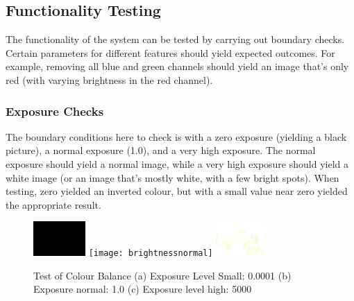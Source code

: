 \documentclass[10pt,a4paper]{article}
\begin{document}
\subsection{Functionality Testing}
The functionality of the system can be tested by carrying out boundary checks. Certain parameters for different features should yield 
expected outcomes. For example, removing all blue and green channels should yield an image that's only red (with varying brightness in the red channel).

\subsubsection{Exposure Checks}
The boundary conditions here to check is with a zero exposure (yielding a black picture), a normal exposure (1.0), and a very high exposure.
The normal exposure should yield a normal image, while a very high exposure should yield a white image (or an image that's mostly white, with a few
bright spots). When testing, zero yielded an inverted colour, but with a small value near zero yielded the appropriate result.


\begin{figure}\label{colourbalancetest}
    \centering
    \subfigure
    {
        \includegraphics[width=75px]{brightnesspoint0001}
    }
    \subfigure
    {
        \texttt{[image: brightnessnormal]}
    }
    \subfigure
    {
        \includegraphics[width=75px]{brightness5000}
    }
    \caption{
        Test of Colour Balance 
        (a) Exposure Level Small: 0.0001
        (b) Exposure normal: 1.0
        (c) Exposure level high: 5000
    }
 \end{figure}
\end{document}
